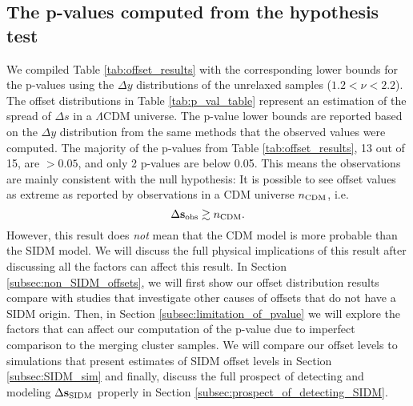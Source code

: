 \subsection{The p-values computed from the hypothesis test}
We compiled Table \ref{tab:offset_results} with the corresponding lower bounds
for the p-values using
the $\Delta y$ distributions of the unrelaxed samples ($1.2 < \nu < 2.2$). 
The offset distributions in Table \ref{tab:p_val_table}
represent an estimation of the spread of $\Delta s$ in a $\Lambda$CDM universe.
The p-value lower bounds are reported based on the $\Delta y$ distribution 
from the same methods that the observed values were computed. 
The majority of the p-values from Table \ref{tab:offset_results}, 13 out of 15, are
$ > 0.05$, and only 2 p-values are below 0.05. 
This means the observations are mainly consistent with the null hypothesis: 
It is possible to see offset values as extreme as reported by observations
in a CDM universe $n_{\rm CDM}$, i.e. 
\begin{equation}
\Delta {\bf s}_{\rm obs} \gtrsim n_{\rm CDM}. 
\end{equation}
However, this result does {\it not} mean that the CDM model is more probable than the SIDM model. 
We will discuss the full physical implications of this result after discussing
all the factors can affect this result. 
In Section \ref{subsec:non_SIDM_offsets},
we will first show our offset distribution results compare with
studies that investigate other causes of offsets that do not have a SIDM origin.
Then, in Section \ref{subsec:limitation_of_pvalue}
we will explore the factors that can affect our computation of the p-value due
to imperfect comparison to the merging cluster samples.   
We will compare our offset levels to simulations that present
estimates of SIDM offset levels in Section \ref{subsec:SIDM_sim}
and finally, discuss the full prospect of detecting and modeling 
$\Delta {\bf s}_{\rm SIDM}$ properly in Section
\ref{subsec:prospect_of_detecting_SIDM}.

